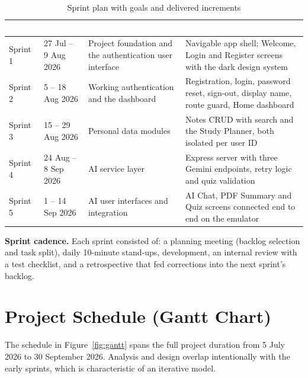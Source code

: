 \documentclass[12pt,a4paper,oneside]{report}
\begin{document}
\begin{table}[H]
\centering
\caption{Sprint plan with goals and delivered increments}
\label{tab:sprints}
\small
\begin{tabularx}{\textwidth}{@{}p{1.5cm}p{2.5cm}Xp{3.1cm}@{}}
\toprule
\rowcolor{tblhead} \textcolor{white}{\textbf{Sprint}} &
\textcolor{white}{\textbf{Dates}} &
\textcolor{white}{\textbf{Goal}} &
\textcolor{white}{\textbf{Increment delivered}} \\
\midrule
Sprint 1 & 27 Jul -- 9 Aug 2026  & Project foundation and the authentication user
  interface & Navigable app shell; Welcome, Login and Register screens with the
  dark design system \\
Sprint 2 & 5 -- 18 Aug 2026      & Working authentication and the dashboard &
  Registration, login, password reset, sign-out, display name, route guard, Home
  dashboard \\
Sprint 3 & 15 -- 29 Aug 2026     & Personal data modules & Notes CRUD with search
  and the Study Planner, both isolated per user ID \\
Sprint 4 & 24 Aug -- 8 Sep 2026  & AI service layer & Express server with three
  Gemini endpoints, retry logic and quiz validation \\
Sprint 5 & 1 -- 14 Sep 2026      & AI user interfaces and integration & AI Chat,
  PDF Summary and Quiz screens connected end to end on the emulator \\
\bottomrule
\end{tabularx}
\end{table}

\noindent\textbf{Sprint cadence.} Each sprint consisted of: a planning meeting
(backlog selection and task split), daily 10-minute stand-ups, development, an
internal review with a test checklist, and a retrospective that fed corrections into
the next sprint's backlog.

\section{Project Schedule (Gantt Chart)}

The schedule in Figure~\ref{fig:gantt} spans the full project duration from
5 July 2026 to 30 September 2026. Analysis and design overlap intentionally with the
early sprints, which is characteristic of an iterative model.
\end{document}
